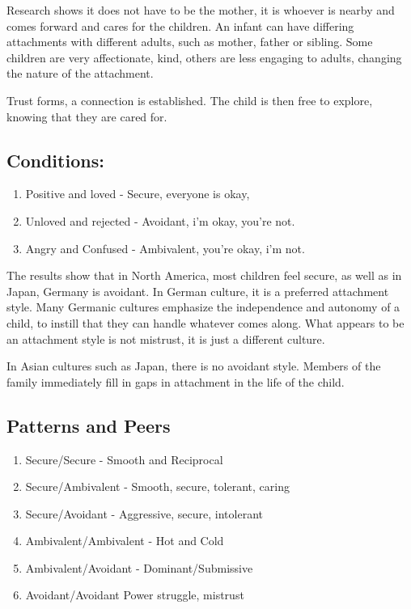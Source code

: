 \documentclass[12pt]{article}
\begin{document}
Research shows it does not have to be the mother, it is whoever is nearby and comes forward and cares for the children. An infant can have differing attachments with different adults, such as  mother, father or sibling. Some children are very affectionate, kind, others are less engaging to adults, changing the nature of the attachment. 

Trust forms, a connection is established. The child is then free to explore, knowing that they are cared for. 

\subsection*{Conditions:}
\begin{enumerate}
\item Positive and loved - Secure, everyone is okay,
\item Unloved and rejected - Avoidant, i'm okay, you're not.
\item Angry and Confused - Ambivalent, you're okay, i'm not.
\end{enumerate}

The results show that in North America, most children feel secure, as well as in Japan, Germany is avoidant. In German culture, it is a preferred attachment style. Many Germanic cultures emphasize the independence and autonomy of a child, to instill that they can handle whatever comes along. What appears to be an attachment style is not mistrust, it is just a different culture.

In Asian cultures such as Japan, there is no avoidant style. Members of the family immediately fill in gaps in attachment in the life of the child. 

\subsection*{Patterns and Peers}
\begin{enumerate}
\item Secure/Secure - Smooth and Reciprocal
\item Secure/Ambivalent - Smooth, secure, tolerant, caring
\item Secure/Avoidant -  Aggressive, secure, intolerant
\item Ambivalent/Ambivalent - Hot and Cold
\item Ambivalent/Avoidant - Dominant/Submissive
\item Avoidant/Avoidant Power struggle, mistrust
\end{enumerate}
\end{document}
